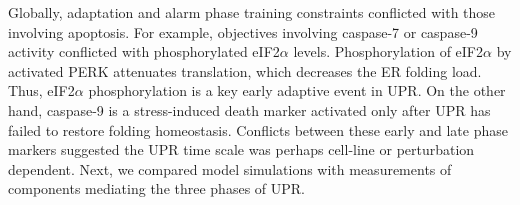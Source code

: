 \documentclass[fleqn,10pt]{wlscirep}
\begin{document}
Globally, adaptation and alarm phase training constraints conflicted with those involving apoptosis.
For example, objectives involving caspase-7 or caspase-9 activity conflicted with phosphorylated eIF2$\alpha$ levels.
Phosphorylation of eIF2$\alpha$ by activated PERK attenuates translation, which decreases the ER folding load.
Thus, eIF2$\alpha$ phosphorylation is a key early adaptive event in UPR. On the other hand, caspase-9 is a stress-induced death marker activated only after UPR has failed to restore folding homeostasis.
Conflicts between these early and late phase markers suggested the UPR time scale was perhaps cell-line or perturbation dependent. Next, we compared model simulations with measurements of components mediating the three phases of UPR.

\end{document}
